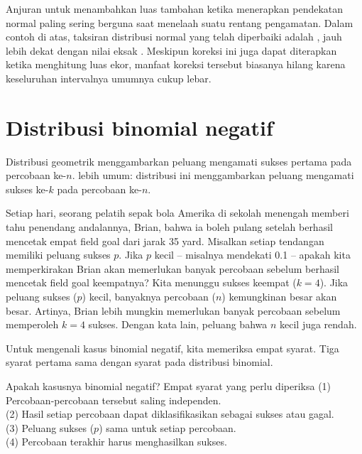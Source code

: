 Anjuran untuk menambahkan luas tambahan ketika menerapkan pendekatan
normal paling sering berguna saat menelaah suatu rentang pengamatan.
Dalam contoh di atas, taksiran distribusi normal yang telah diperbaiki
adalah \smokeABCNormalFixed{}, jauh lebih dekat dengan nilai eksak
\smokeABCBinom{}. Meskipun koreksi ini juga dapat diterapkan ketika
menghitung luas ekor, manfaat koreksi tersebut biasanya hilang karena
keseluruhan intervalnya umumnya cukup lebar.



{}




\section{Distribusi binomial negatif}
\label{negativeBinomial}


Distribusi geometrik menggambarkan peluang mengamati sukses pertama pada percobaan ke-$n$.  lebih umum: distribusi ini menggambarkan peluang mengamati sukses ke-$k$ pada percobaan ke-$n$.

\begin{examplewrap}
\begin{nexample}{Setiap hari, seorang pelatih sepak bola Amerika di sekolah menengah memberi tahu penendang andalannya, Brian, bahwa ia boleh pulang setelah berhasil mencetak empat field goal dari jarak 35 yard. Misalkan setiap tendangan memiliki peluang sukses $p$. Jika $p$ kecil -- misalnya mendekati 0.1 -- apakah kita memperkirakan Brian akan memerlukan banyak percobaan sebelum berhasil mencetak field goal keempatnya?}
Kita menunggu sukses keempat ($k=4$). Jika peluang sukses ($p$) kecil, banyaknya percobaan ($n$) kemungkinan besar akan besar. Artinya, Brian lebih mungkin memerlukan banyak percobaan sebelum memperoleh $k=4$ sukses. Dengan kata lain, peluang bahwa $n$ kecil juga rendah.
\end{nexample}
\end{examplewrap}

Untuk mengenali kasus binomial negatif, kita memeriksa empat syarat. Tiga syarat pertama sama dengan syarat pada distribusi binomial.

\begin{onebox}{Apakah kasusnya binomial negatif? Empat syarat yang perlu diperiksa}
(1) Percobaan-percobaan tersebut saling independen. \\
(2) Hasil setiap percobaan dapat diklasifikasikan sebagai sukses atau gagal. \\
(3) Peluang sukses ($p$) sama untuk setiap percobaan. \\
(4) Percobaan terakhir harus menghasilkan sukses.
\end{onebox}

